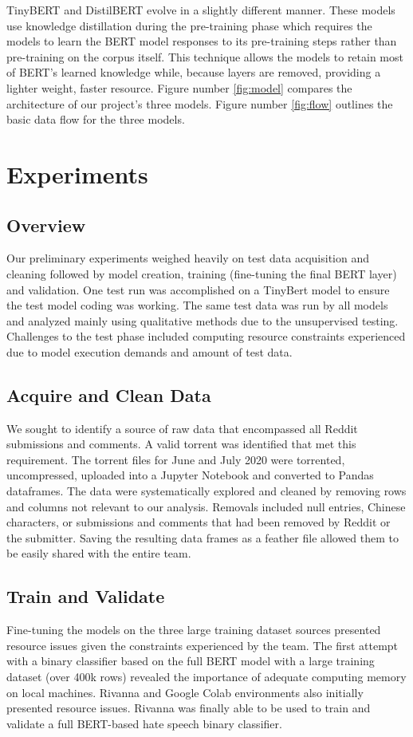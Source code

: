 \documentclass[conference]{IEEEtran}
\begin{document}
TinyBERT and DistilBERT evolve in a slightly different manner. These models use knowledge distillation during the pre-training phase which requires the models to learn the BERT model responses to its pre-training steps rather than pre-training on the corpus itself. This technique allows the models to retain most of BERT's learned knowledge while, because layers are removed, providing a lighter weight, faster resource\cite{b16}. Figure number \ref{fig:model} compares the architecture of our project's three models. Figure number \ref{fig:flow} outlines the basic data flow for the three models.

\section{Experiments}
\subsection{Overview}
Our preliminary experiments weighed heavily on test data acquisition and cleaning followed by model creation, training (fine-tuning the final BERT layer) and validation. One test run was accomplished on a TinyBert model to ensure the test model coding was working. The same test data was run by all models and analyzed mainly using qualitative methods due to the unsupervised testing.  Challenges to the test phase included computing resource constraints experienced due to model execution demands and amount of test data. 

\subsection{Acquire and Clean Data}
We sought to identify a source of raw data that encompassed all Reddit submissions and comments. A valid torrent was identified that met this requirement. The torrent files\cite{b17} for June and July 2020 were torrented, uncompressed, uploaded into a Jupyter Notebook and converted to Pandas dataframes. The data were systematically explored and cleaned by removing rows and columns not relevant to our analysis. Removals included null entries, Chinese characters, or submissions and comments that had been removed by Reddit or the submitter. Saving the resulting data frames as a feather file allowed them to be easily shared with the entire team. 

\subsection{Train and Validate}
 Fine-tuning the models on the three large training dataset sources presented resource issues given the constraints experienced by the team. The first attempt with a binary classifier based on the full BERT model with a large training dataset (over 400k rows) revealed the importance of adequate computing memory on local machines. Rivanna and Google Colab environments also initially presented resource issues. Rivanna was finally able to be used to train and validate a full BERT-based hate speech binary classifier.
 
\end{document}
